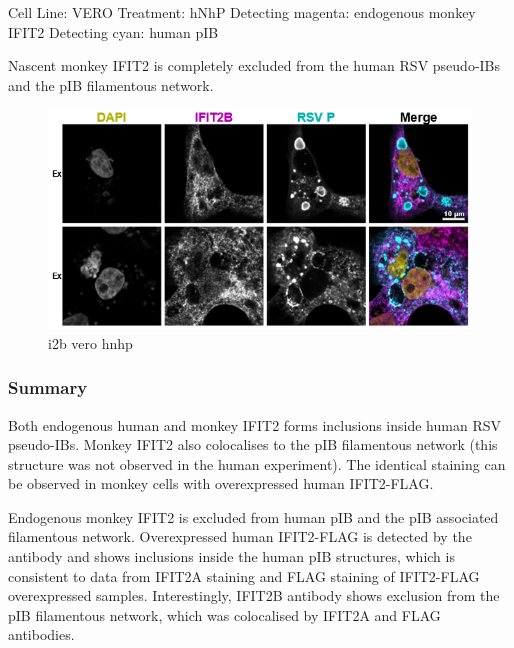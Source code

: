 Cell Line: VERO \newline
Treatment: hNhP \newline
Detecting magenta: endogenous monkey IFIT2 \newline
Detecting cyan: human pIB \newline

Nascent monkey IFIT2 is completely excluded from the human RSV pseudo-IBs and the pIB filamentous network.

\begin{figure}
    \centering
    \includegraphics[width=1\linewidth]{10. Chapter 5/Figs/02. pIB/05. i2b vero hnhp.png}
    \caption[i2b vero hnhp]{i2b vero hnhp}
    \label{fig:i2b vero hnhp}
\end{figure}

\subsubsection{Summary} \label{Summary-i2-infection}
Both endogenous human and monkey IFIT2 forms inclusions inside human RSV pseudo-IBs. Monkey IFIT2 also colocalises to the pIB filamentous network (this structure was not observed in the human experiment). The identical staining can be observed in monkey cells with overexpressed human IFIT2-FLAG.

Endogenous monkey IFIT2 is excluded from human pIB and the pIB associated filamentous network. Overexpressed human IFIT2-FLAG is detected by the antibody and shows inclusions inside the human pIB structures, which is consistent to data from IFIT2A staining and FLAG staining of IFIT2-FLAG overexpressed samples. Interestingly, IFIT2B antibody shows exclusion from the pIB filamentous network, which was colocalised by IFIT2A and FLAG antibodies.